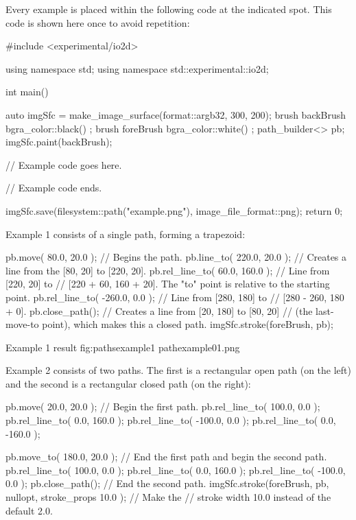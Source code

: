 \pnum
Every example is placed within the following code at the indicated spot. This code is shown here once to avoid repetition:

\begin{codeblock}
#include <experimental/io2d>

using namespace std;
using namespace std::experimental::io2d;

int main() {
  auto imgSfc = make_image_surface(format::argb32, 300, 200);
  brush backBrush{ bgra_color::black() };
  brush foreBrush{ bgra_color::white() };
  path_builder<> pb{};
  imgSfc.paint(backBrush);
  
  // Example code goes here.

  // Example code ends.
  
  imgSfc.save(filesystem::path("example.png"), image_file_format::png);
  return 0;
}
\end{codeblock}

\pnum
Example 1 consists of a single path, forming a trapezoid:

\begin{codeblock}
  pb.move({ 80.0, 20.0 }); // Begins the path.
  pb.line_to({ 220.0, 20.0 }); // Creates a line from the [80, 20] to [220, 20].
  pb.rel_line_to({ 60.0, 160.0 }); // Line from [220, 20] to
    // [220 + 60, 160 + 20]. The "to" point is relative to the starting point.
  pb.rel_line_to({ -260.0, 0.0 }); // Line from [280, 180] to 
    // [280 - 260, 180 + 0].
  pb.close_path(); // Creates a line from [20, 180] to [80, 20] 
    // (the last-move-to point), which makes this a closed path.
  imgSfc.stroke(foreBrush, pb);
\end{codeblock}

\begin{importgraphiciotwod}
{Example 1 result}
{fig:pathsexample1}
{pathexample01.png}
\end{importgraphiciotwod}

\FloatBarrier

\pnum
Example 2 consists of two paths. The first is a rectangular open path (on the left) and the second is a rectangular closed path (on the right):

\begin{codeblock}
  pb.move({ 20.0, 20.0 }); // Begin the first path.
  pb.rel_line_to({ 100.0, 0.0 });
  pb.rel_line_to({ 0.0, 160.0 });
  pb.rel_line_to({ -100.0, 0.0 });
  pb.rel_line_to({ 0.0, -160.0 });
  
  pb.move_to({ 180.0, 20.0 }); // End the first path and begin the second path.
  pb.rel_line_to({ 100.0, 0.0 });
  pb.rel_line_to({ 0.0, 160.0 });
  pb.rel_line_to({ -100.0, 0.0 });
  pb.close_path(); // End the second path.
  imgSfc.stroke(foreBrush, pb, nullopt, stroke_props{ 10.0 }); // Make the
    // stroke width 10.0 instead of the default 2.0.
\end{codeblock}

